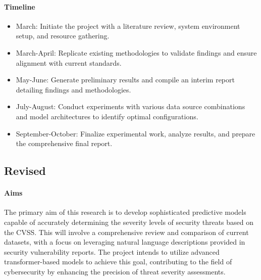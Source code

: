 \documentclass[12pt]{article}
\begin{document}
\paragraph{Timeline}
\begin{itemize}[noitemsep]
	\item March: Initiate the project with a literature review, system environment setup, and resource gathering.
	\item March-April: Replicate existing methodologies to validate findings and ensure alignment with current standards.
	\item May-June: Generate preliminary results and compile an interim report detailing findings and methodologies.
	\item July-August: Conduct experiments with various data source combinations and model architectures to identify optimal configurations.
	\item September-October: Finalize experimental work, analyze results, and prepare the comprehensive final report.
\end{itemize}

\subsection*{Revised}

\paragraph{Aims}

The primary aim of this research is to develop sophisticated predictive models capable of accurately determining
the severity levels of security threats based on the CVSS. This will involve a comprehensive review and comparison
of current datasets, with a focus on leveraging natural language descriptions provided in security vulnerability reports.
The project intends to utilize advanced transformer-based models to achieve this goal, contributing to the field of
cybersecurity by enhancing the precision of threat severity assessments.
\end{document}

